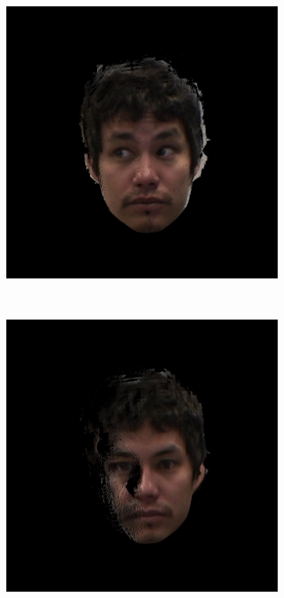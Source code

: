 \begin{figure}[h]
\begin{subfigure}[b]{0.32\textwidth}
	\end{subfigure}
	\begin{subfigure}[b]{0.32\textwidth}
		\includegraphics[width=1.1\linewidth]{./img/eyeimages/s3.jpg}
	\end{subfigure}
	\\
	\begin{subfigure}[b]{0.24\textwidth}
		\includegraphics[width=1.1\linewidth]{./img/eyeimages/f1.jpg}

\end{subfigure}
\end{figure}
